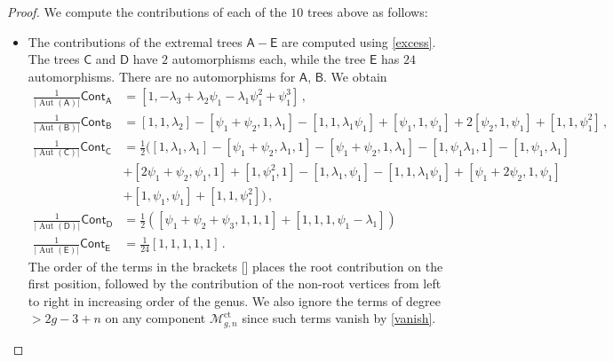\documentclass[11pt]{amsart}
\theoremstyle{definition}
\newcommand{\M}{\mathcal{M}}
\DeclareMathOperator{\ct}{ct}
\DeclareMathOperator{\Aut}{Aut}
\begin{document}
{\begin{proof}
We compute the contributions of each of the $10$ trees above as follows: 
\begin{itemize}
    \item [(i)]
The contributions of the extremal trees $\mathsf A-\mathsf E$ are computed using \eqref{excess}. The trees $\mathsf{C}$ and $\mathsf{D}$ have $2$ automorphisms each, while the tree $\mathsf E$ has $24$ automorphisms. There are no automorphisms for $\mathsf{A}$, $\mathsf {B}$. We obtain
\begin{align*}
\frac{1}{|\Aut(\mathsf{A})|}\mathsf{Cont}_{\mathsf{A}}&=[1,-\lambda_3+\lambda_2\psi_1-\lambda_1\psi_1^2+\psi_1^3]\,,\\
\frac{1}{|\Aut(\mathsf{B})|}\mathsf{Cont}_{\mathsf{B}}&= [1, 1, \lambda_2]-[\psi_1+\psi_2, 1, \lambda_1]-[1, 1, \lambda_1\psi_1]+[\psi_1, 1, \psi_1]+2[\psi_2, 1, \psi_1]+[1, 1, \psi_1^2]\,,\\
\frac{1}{|\Aut(\mathsf{C})|}\mathsf{Cont}_{\mathsf{C}}&=\frac{1}{2} ([1, \lambda_1, \lambda_1]-[\psi_1+\psi_2, \lambda_1, 1]-[\psi_1+\psi_2, 1, \lambda_1]-[1, \psi_1\lambda_1, 1]-[1, \psi_1, \lambda_1]\\& +[2\psi_1+\psi_2, \psi_1, 1] +[1, \psi_1^2, 1]-[1, \lambda_1, \psi_1]-[1, 1, \lambda_1\psi_1]+[\psi_1+2\psi_2, 1, \psi_1]\\&+[1, \psi_1, \psi_1]+[1, 1, \psi_1^2])\,,\\
\frac{1}{|\Aut(\mathsf{D})|}\mathsf{Cont}_{\mathsf{D}}&=\frac{1}{2}\left([\psi_1+\psi_2+\psi_3,1,1,1]+[1,1, 1, \psi_1-\lambda_1]\right)\,\\
\frac{1}{|\Aut(\mathsf{E})|}\mathsf{Cont}_{\mathsf{E}}&=\frac{1}{24}[1,1,1,1,1]\, .
\end{align*}
The order of the terms in the brackets [] places the root contribution on the first position, followed by the contribution of the non-root vertices from left to right in increasing order of the genus. %
We also ignore the terms of degree $>2g-3+n$ on any component $\M_{g, n}^{\ct}$ since such terms vanish by \eqref{vanish}. 


\end{itemize}
\end{proof}}
\end{document}
